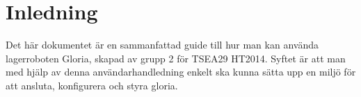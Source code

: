\section{Inledning}

Det här dokumentet är en sammanfattad guide till hur man kan använda lagerroboten Gloria, skapad av grupp 2 för TSEA29 HT2014.
\newline
\newline
Syftet är att man med hjälp av denna användarhandledning enkelt ska kunna sätta upp en miljö för att ansluta, konfigurera och styra gloria.